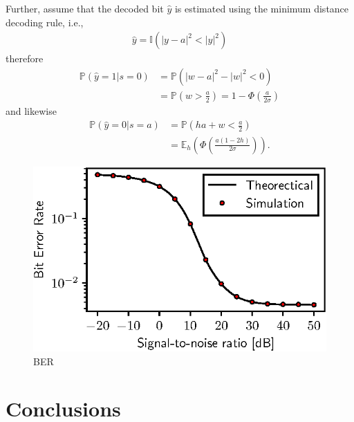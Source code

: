 \documentclass[conference, 10pt]{IEEEtran}
\begin{document}
Further, assume that the decoded bit $\hat{y}$ is estimated using the minimum distance decoding
rule, i.e.,
\begin{align}
    \hat{y} = \mathbb{I}(|y - a|^2 < |y|^2)
\end{align}
therefore
\begin{align}
    \mathbb{P}\left(\hat{y} = 1 | s = 0\right) & = \mathbb{P}\left(|w - a|^2 - |w|^2 < 0\right)\nonumber\\
    & = \mathbb{P}\left(w > \frac{a}{2}\right) = 1 - \Phi\left(\frac{a}{2\sigma}\right)
\end{align}
and likewise
\begin{align}
    \mathbb{P}\left(\hat{y} = 0 | s = a\right) & = \mathbb{P}\left(ha + w < \frac{a}{2}\right) \nonumber\\
    & = \mathbb{E}_h\left(\Phi\left(\frac{a(1 - 2h)}{2\sigma}\right)\right).
\end{align}

\begin{figure}[!htb]
    \centering
    \includegraphics{figures/ber.eps}
    \caption{BER}
    \label{fig:ber}
\end{figure}

\section{Conclusions}



\end{document}
